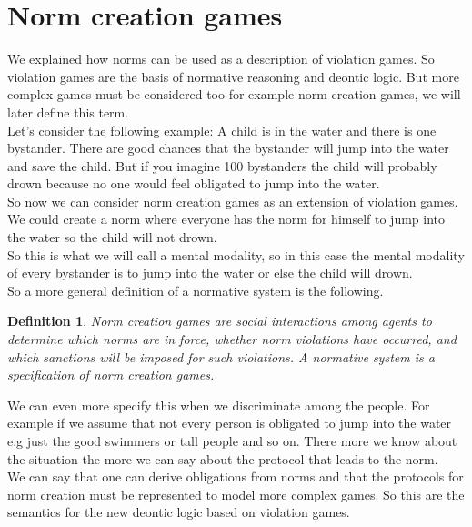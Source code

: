 \documentclass[conference]{IEEE}
\newtheorem{definition}{Definition}
\begin{document}
\section{Norm creation games}
We explained how norms can be used as a description of violation games. So violation games are the basis of normative reasoning and deontic logic. But more complex games must be considered too for example norm creation games, we will later define this term.\\
Let's consider the following example: A child is in the water and there is one bystander. There are good chances that the bystander will jump into the water and save the child. But if you imagine 100 bystanders the child will probably drown because no one would feel obligated to jump into the water.\\
So now we can consider norm creation games as an extension of violation games. We could create a norm where everyone has the norm for himself to jump into the water so the child will not drown.\\
So this is what we will call a mental modality, so in this case the mental modality of every bystander is to jump into the water or else the child will drown.\\
So a more general definition of a normative system is the following.\\

\begin{definition}
Norm creation games are social
interactions among agents to determine which norms are in force, whether norm violations have occurred, and which sanctions will be imposed for such violations. A
normative system is a specification of norm creation games.\cite{b2}\\
\end{definition}

We can even more specify this when we discriminate among the people. For example if we assume that not every person is obligated to jump into the water e.g just the good swimmers or tall people and so on. There more we know about the situation the more we can say about the protocol that leads to the norm.\\
We can say that one can derive obligations from norms and that the protocols for norm creation must be represented to model more complex games. So this are the semantics for the new deontic logic based on violation games.
\end{document}
